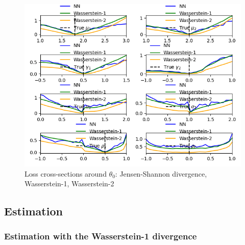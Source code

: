 \begin{figure}
    \includegraphics[width=\textwidth]{./Images/loss_plots narrow_crosshairs w1 w2 JS.png} %
    \caption{Loss cross-sections around $\theta_0$: Jensen-Shannon divergence, Wasserstein-1, Wasserstein-2}
    \label{fig:wasserstein_crosshairs}
\end{figure}

\subsection{Estimation}
\subsubsection{Estimation with the Wasserstein-1 divergence}

